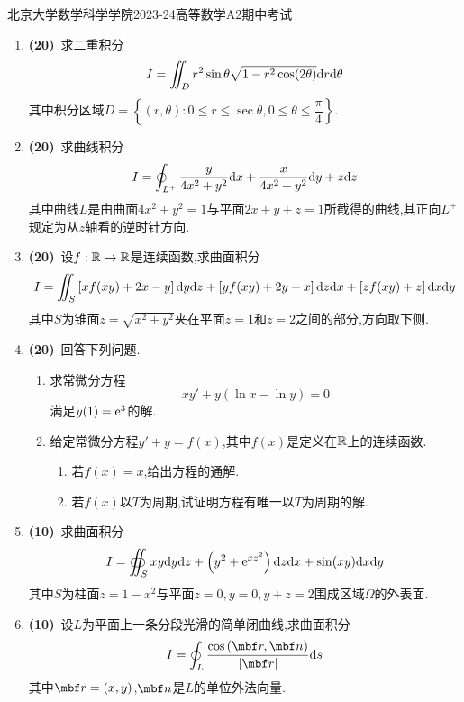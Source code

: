 \documentclass{ctexart}
\begin{document}
\pagestyle{empty}
\begin{center}\Large
    北京大学数学科学学院2023-24高等数学A2期中考试
\end{center}
\begin{enumerate}[leftmargin=*,label=\textbf{\arabic*.}]
    \item \textbf{(20)}\ 求二重积分
        \[I=\iint_{D}r^2\sin\theta\sqrt{1-r^2\cos(2\theta)}\mathrm{d} r\mathrm{d}\theta\]
        其中积分区域$D=\left\{(r,\theta):0\leqslant r\leqslant\sec\theta,0\leqslant\theta\leqslant\dfrac\pi4\right\}$.

    \item \textbf{(20)}\ 求曲线积分
        \[I=\oint_{L^+}\dfrac{-y}{4x^2+y^2}\mathrm{d} x+\dfrac{x}{4x^2+y^2}\mathrm{d} y+z\mathrm{d} z\]
        其中曲线$L$是由曲面$4x^2+y^2=1$与平面$2x+y+z=1$所截得的曲线,其正向$L^+$规定为从$z$轴看的逆时针方向.

    \item \textbf{(20)}\ 设$f:\mathbb{R}\to\mathbb{R}$是连续函数,求曲面积分
        \[I=\iint_S\left[xf(xy)+2x-y\right]\mathrm{d} y\mathrm{d} z+\left[yf(xy)+2y+x\right]\mathrm{d} z\mathrm{d} x+\left[zf(xy)+z\right]\mathrm{d} x\mathrm{d} y\]
        其中$S$为锥面$z=\sqrt{x^2+y^2}$夹在平面$z=1$和$z=2$之间的部分,方向取下侧.

    \item \textbf{(20)}\ 回答下列问题.
        \begin{enumerate}[label=\tbf{(\arabic*)}]
            \item 求常微分方程
                \[xy'+y\left(\ln x-\ln y\right)=0\]
                满足$y(1)=\mathrm{e}^3$的解.
            \item 给定常微分方程$y'+y=f(x)$,其中$f(x)$是定义在$\mathbb{R}$上的连续函数.
                \begin{enumerate}[label=\tbf{(\alph*)}]
                    \item 若$f(x)=x$,给出方程的通解.
                    \item 若$f(x)$以$T$为周期,试证明方程有唯一以$T$为周期的解.
                \end{enumerate}
        \end{enumerate}
        
    \item \textbf{(10)}\ 求曲面积分
        \[I=\oiint_{S}xy\mathrm{d} y\mathrm{d} z+\left(y^2+\mathrm{e}^{xz^2}\right)\mathrm{d} z\mathrm{d} x+\sin(xy)\mathrm{d} x\mathrm{d} y\]
        其中$S$为柱面$z=1-x^2$与平面$z=0,y=0,y+z=2$围成区域$\Omega$的外表面.

    \item \textbf{(10)}\ 设$L$为平面上一条分段光滑的简单闭曲线,求曲面积分
        \[I=\oint_{L}\dfrac{\cos\left(\mbf r,\mbf n\right)}{\left|\mbf r\right|}\di s\]
        其中$\mbf r=(x,y)$,$\mbf n$是$L$的单位外法向量.

\end{enumerate}
\end{document}
